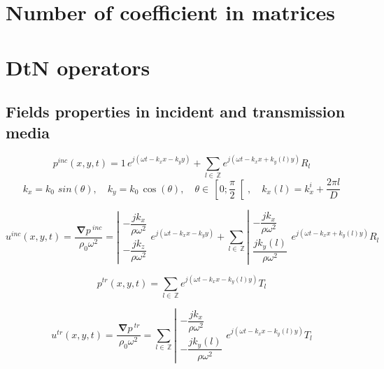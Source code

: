 \documentclass[11pt,A4paper]{book}
\newcommand{\ds}{\displaystyle}
\newcommand{\mb}{\, \mathbb}
\newcommand{\esp}{, \quad}
\newcommand{\Gd}[1]{\,\boldsymbol{\nabla}#1\,}
\renewcommand{\:}{\tb{:}}
\begin{document}
\section{Number of coefficient in matrices}



\section{DtN operators}

\subsection{Fields properties in incident and transmission media}


\begin{equation}
p^{inc}(x,y,t)=1\, e^{j(\omega t- k_x x-k_y y)}+\ds{\sum_{l\in\mb{Z}}} 
e^{j(\omega t- k_x x+k_y(l) y)}R_l
\end{equation}
\begin{equation}
k_x=k_0\,\,sin(\theta)\esp k_y=k_0\,\cos(\theta) \esp \theta\in \,\left[0;\dfrac{\pi}{2}\right[ \esp k_x(l)=k_x^i+\dfrac{2\pi l}{D}
\end{equation}

\begin{equation}
u^{inc}(x,y,t)=\dfrac{\Gd p^{inc}}{\rho_0\omega^2}=\left| 
\begin{array}{c}
{-\dfrac{j k_x}{\rho\omega^2}}\\
{-\dfrac{j k_z}{\rho\omega^2}}
\end{array}
\right.
e^{j(\omega t- k_x x-k_y y)}+
\ds{\sum_{l\in\mb{Z}}}
\left| 
\begin{array}{c}
{-\dfrac{j k_x}{\rho\omega^2}}\\
{ \dfrac{j k_y(l)}{\rho\omega^2}}
\end{array}
\right. 
e^{j(\omega t- k_x x+k_y(l) y)}R_l
\end{equation}


\begin{equation}
p^{tr}(x,y,t)=\ds{\sum_{l\in\mb{Z}}} 
e^{j(\omega t- k_x x-k_y(l) y)}T_l
\end{equation}

\begin{equation}
u^{tr}(x,y,t)=\dfrac{\Gd p^{tr}}{\rho_0\omega^2}=
\ds{\sum_{l\in\mb{Z}}}
\left| 
\begin{array}{c}
{-\dfrac{j k_x}{\rho\omega^2}}\\
{-\dfrac{j k_y(l)}{\rho\omega^2}}
\end{array}
\right. 
e^{j(\omega t- k_x x-k_y(l) y)}T_l
\end{equation}
\end{document}
